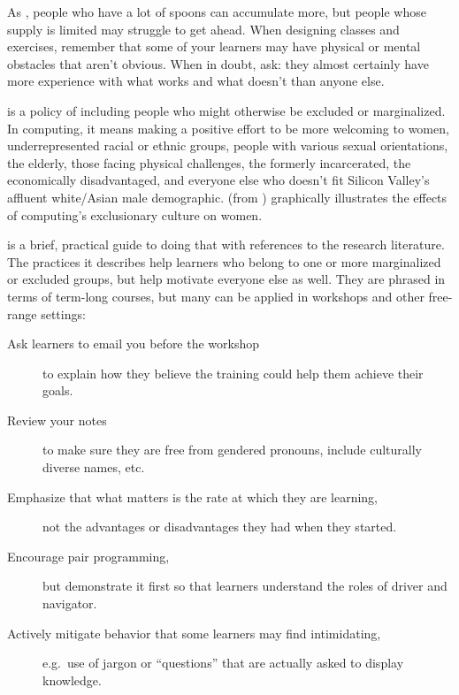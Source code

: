 As ,
people who have a lot of spoons can accumulate more,
but people whose supply is limited may struggle to get ahead.
When designing classes and exercises,
remember that some of your learners may have physical or mental obstacles that aren't obvious.
When in doubt, ask:
they almost certainly have more experience with what works and what doesn't than anyone else.


 is a policy of
including people who might otherwise be excluded or marginalized.
In computing,
it means making a positive effort to be more welcoming to women,
underrepresented racial or ethnic groups,
people with various sexual orientations,
the elderly,
those facing physical challenges,
the formerly incarcerated,
the economically disadvantaged,
and everyone else who doesn't fit Silicon Valley's affluent white/Asian male demographic.
 (from )
graphically illustrates the effects of computing's exclusionary culture on women.


\cite{Lee2017} is a brief, practical guide to doing that with references to the research literature.
The practices it describes help learners who belong to one or more marginalized or excluded groups,
but help motivate everyone else as well.
They are phrased in terms of term-long courses,
but many can be applied in workshops and other free-range settings:

\begin{description}

\item[Ask learners to email you before the workshop]
  to explain how they believe the training could help them achieve their goals.

\item[Review your notes]
  to make sure they are free from gendered pronouns, include culturally diverse names, etc.

\item[Emphasize that what matters is the rate at which they are learning,]
  not the advantages or disadvantages they had when they started.

\item[Encourage pair programming,]
  but demonstrate it first so that learners understand the roles of driver and navigator.

\item[Actively mitigate behavior that some learners may find intimidating,]
  e.g.\ use of jargon or ``questions'' that are actually asked to display knowledge.

\end{description}

